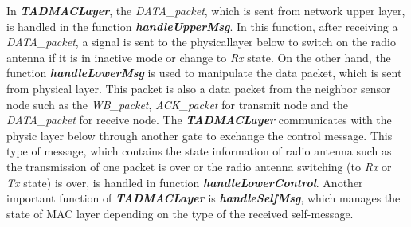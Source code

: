 \documentclass[conference]{IEEEtran}
\begin{document}
In \textit{\textbf{TADMACLayer}}, the \textit{DATA\_packet}, which is sent from network upper layer, is handled in the function \textit{\textbf{handleUpperMsg}}. In this function, after receiving a \textit{DATA\_packet}, a signal is sent to the physicallayer below to switch on the radio antenna if it is in inactive mode or change to \textit{Rx} state. On the other hand, the function \textit{\textbf{handleLowerMsg}} is used to manipulate the data packet, which is sent from physical layer. This packet is also a data packet from the neighbor sensor node such as the \textit{WB\_packet}, \textit{ACK\_packet} for transmit node and the \textit{DATA\_packet} for receive node. The \textit{\textbf{TADMACLayer}} communicates with the physic layer below through another gate to exchange the control message. This type of message, which contains the state information of radio antenna such as the transmission of one packet is over or the radio antenna switching (to \textit{Rx} or \textit{Tx} state) is over, is handled in function \textit{\textbf{handleLowerControl}}. Another important function of \textit{\textbf{TADMACLayer}} is \textit{\textbf{handleSelfMsg}}, which manages the state of MAC layer depending on the type of the received self-message.
\end{document}

